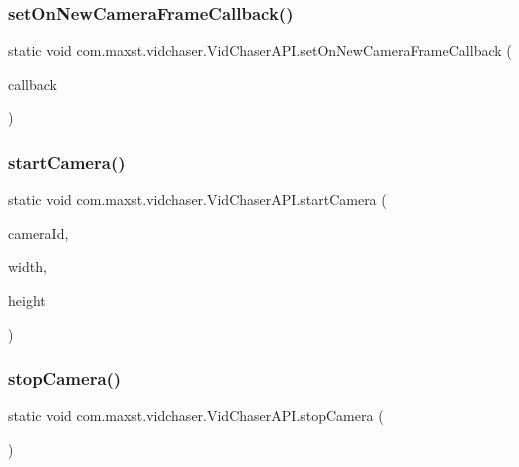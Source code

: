 \subsubsection{\texorpdfstring{set\+On\+New\+Camera\+Frame\+Callback()}{setOnNewCameraFrameCallback()}}
{\footnotesize\ttfamily static void com.\+maxst.\+vidchaser.\+Vid\+Chaser\+A\+P\+I.\+set\+On\+New\+Camera\+Frame\+Callback (\begin{DoxyParamCaption}\item[{\hyperlink{interfacecom_1_1maxst_1_1vidchaser_1_1_on_new_camera_frame_callback}{On\+New\+Camera\+Frame\+Callback}}]{callback }\end{DoxyParamCaption})\hspace{0.3cm}{\ttfamily [static]}}

\mbox{\label{classcom_1_1maxst_1_1vidchaser_1_1_vid_chaser_a_p_i_ab4f43383db7d47da64c1c2b9ab8167ac}} 
\subsubsection{\texorpdfstring{start\+Camera()}{startCamera()}}
{\footnotesize\ttfamily static void com.\+maxst.\+vidchaser.\+Vid\+Chaser\+A\+P\+I.\+start\+Camera (\begin{DoxyParamCaption}\item[{int}]{camera\+Id,  }\item[{int}]{width,  }\item[{int}]{height }\end{DoxyParamCaption})\hspace{0.3cm}{\ttfamily [static]}}

\mbox{\label{classcom_1_1maxst_1_1vidchaser_1_1_vid_chaser_a_p_i_af7092d1f3dcca228cb6a45f263e35120}} 
\subsubsection{\texorpdfstring{stop\+Camera()}{stopCamera()}}
{\footnotesize\ttfamily static void com.\+maxst.\+vidchaser.\+Vid\+Chaser\+A\+P\+I.\+stop\+Camera (\begin{DoxyParamCaption}{ }\end{DoxyParamCaption})\hspace{0.3cm}{\ttfamily [static]}}

